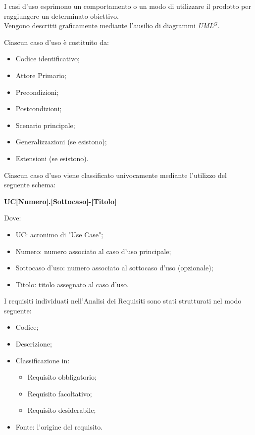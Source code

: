 

    I casi d’uso esprimono un comportamento o un modo di utilizzare il prodotto per raggiungere un determinato obiettivo. \\
    Vengono descritti graficamente mediante l’ausilio di diagrammi \emph{UML}$^{G}$. 

    Ciascun caso d’uso è costituito da:
    \begin{itemize}
        \item Codice identificativo;
        \item Attore Primario;
        \item Precondizioni;
        \item Postcondizioni;
        \item Scenario principale;
        \item Generalizzazioni (se esistono);
        \item Estensioni (se esistono).
        
    \end{itemize}


    Ciascun caso d’uso viene classificato univocamente mediante l’utilizzo del seguente schema:

        \begin{center}
            \large{\textbf{UC[Numero].[Sottocaso]-[Titolo]}}
        \end{center}
    Dove:
    \begin{itemize}
        \item UC: acronimo di "Use Case";
        \item Numero: numero associato al caso d'uso principale;
        \item Sottocaso d'uso: numero associato al sottocaso d'uso (opzionale);
        \item Titolo: titolo assegnato al caso d'uso.
    \end{itemize}
    

    I requisiti individuati nell’Analisi dei Requisiti sono stati strutturati nel modo seguente:

    \begin{itemize}
        \item Codice;
        \item Descrizione;
        \item Classificazione in:  \begin{itemize}
                                        \item Requisito obbligatorio;
                                        \item Requisito facoltativo;
                                        \item Requisito desiderabile;
        \end{itemize}
        \item Fonte: l'origine del requisito.
    \end{itemize}

